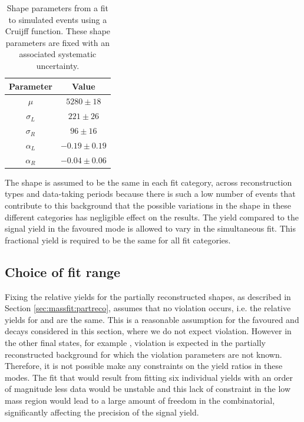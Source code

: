 \begin{table}[h]
\centering
\begin{tabular}{cc}
\hline
Parameter & Value \\
\hline
$\mu$ & $5280 \pm 18$ \\
$\sigma_L$ & $221 \pm 26$ \\
$\sigma_R$ & $96 \pm 16$ \\
$\alpha_L$ & $-0.19 \pm 0.19$ \\
$\alpha_R$ & $-0.04 \pm 0.06$ \\
\hline
\end{tabular}
\caption{Shape parameters from a fit to simulated \decay{\Lb}{\Lc\Km} events using a Cruijff function. These shape parameters are fixed with an associated systematic uncertainty.}
\label{fitresultsLb}
\end{table}

The shape is assumed to be the same in each \kk fit category, across \KS reconstruction types and data-taking periods because there is such a low number of events that contribute to this background that the possible variations in the shape in these different categories has negligible effect on the results. The  yield compared to the signal yield in the favoured \kpi mode is allowed to vary in the simultaneous fit. This fractional yield is required to be the same for all fit categories.

\subsection{Choice of fit range}
\label{sec:cpfit:range}	

Fixing the relative yields for the partially reconstructed shapes, as described in Section \ref{sec:massfit:partreco}, assumes that no \CP violation occurs, i.e. the relative yields for \Bm and \Bp are the same. This is a reasonable assumption for the favoured \kpi and \kpipipi decays considered in this section, where we do not expect \CP violation. However in the other \D final states, for example \pik, \CP violation is expected in the partially reconstructed background for which the \CP violation parameters are not known. Therefore, it is not possible make any constraints on the yield ratios in these modes. The fit that would result from fitting six individual yields with an order of magnitude less data would be unstable and this lack of constraint in the low mass region would lead to a large amount of freedom in the combinatorial, significantly affecting the precision of the signal yield. 

